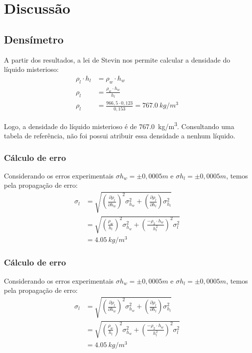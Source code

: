 \section{Discussão}
\subsection{Densímetro}

A partir dos resultados, a lei de Stevin nos permite calcular a densidade do
líquido misterioso:
\begin{align*}
    \rho_l \cdot h_l &= \rho_w \cdot h_w\\
    \rho_l &= \frac{\rho_w \cdot h_w}{h_l}\\
    \rho_l &= \frac{966,5 \cdot 0,123}{0,153} = \qty{767,0}{kg/m^3} 
\end{align*}

Logo, a densidade do líquido misterioso é de \qty{767,0}{kg/m^3}. Consultando
uma tabela de referência, não foi possui atribuir essa densidade a nenhum
líquido.

\subsubsection{Cálculo de erro}
Considerando os erros experimentais \(\sigma h_w = \pm0,0005 m\) e \(\sigma h_l = \pm 0,0005 m\), temos pela propagação de erro:
\begin{align*}
    \sigma_l &= \sqrt{\left(\frac{\partial\rho_l}{\partial h_w}\right)^2\sigma_{h_w}^2 + \left(\frac{\partial\rho_l}{\partial h_l}\right)\sigma_{h_l}^2}\\
    &= \sqrt{\left(\frac{\rho_w}{h_l}\right)^2 \sigma_{h_w}^2 + \left(\frac{-\rho_2 \cdot h_w}{h_l^2}\right)^2\sigma_l^2}\\
    &= \qty{4,05}{kg/m^3}
\end{align*}


\subsubsection{Cálculo de erro}
Considerando os erros experimentais \(\sigma h_w = \pm0,0005 m\) e \(\sigma h_l = \pm 0,0005 m\), temos pela propagação de erro:
\begin{align*}
    \sigma_l &= \sqrt{\left(\frac{\partial\rho_l}{\partial h_w}\right)^2\sigma_{h_w}^2 + \left(\frac{\partial\rho_l}{\partial h_l}\right)\sigma_{h_l}^2}\\
    &= \sqrt{\left(\frac{\rho_w}{h_l}\right)^2 \sigma_{h_w}^2 + \left(\frac{-\rho_2 \cdot h_w}{h_l^2}\right)^2\sigma_l^2}\\
    &= \qty{4,05}{kg/m^3}
\end{align*}


